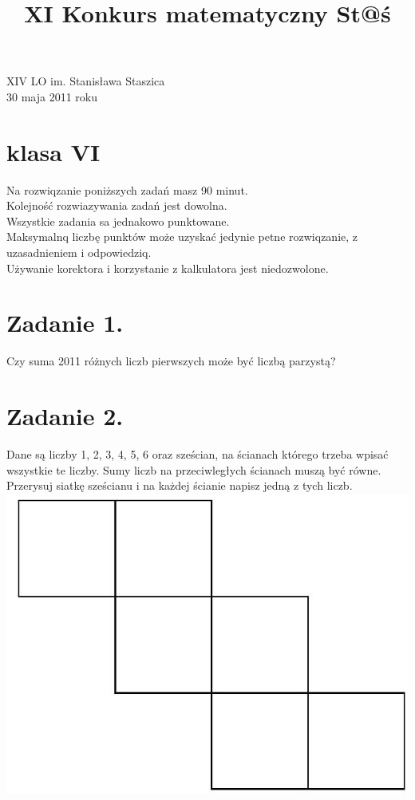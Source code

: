 \documentclass[10pt]{article}
\title{XI Konkurs matematyczny St@ś }
\author{}
\date{}
\begin{document}
\maketitle
XIV LO im. Stanisława Staszica\\
30 maja 2011 roku

\section*{klasa VI}
Na rozwiqzanie poniższych zadań masz 90 minut.\\
Kolejność rozwiazywania zadań jest dowolna.\\
Wszystkie zadania sa jednakowo punktowane.\\
Maksymalnq liczbę punktów może uzyskać jedynie petne rozwiqzanie, z uzasadnieniem i odpowiedziq.\\
Używanie korektora i korzystanie z kalkulatora jest niedozwolone.

\section*{Zadanie 1.}
Czy suma 2011 różnych liczb pierwszych może być liczbą parzystą?

\section*{Zadanie 2.}
Dane są liczby 1, 2, 3, 4, 5, 6 oraz sześcian, na ścianach którego trzeba wpisać wszystkie te liczby. Sumy liczb na przeciwległych ścianach muszą być równe.\\
Przerysuj siatkę sześcianu i na każdej ścianie napisz jedną z tych liczb.\\
\includegraphics[max width=\textwidth, center]{2024_11_21_3799db89e062e92fb27eg-1}
\end{document}
